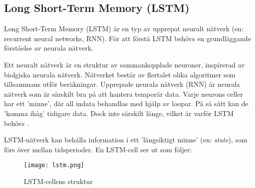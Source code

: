 \documentclass[12pt]{article}
\begin{document}
\subsection{Long Short-Term Memory (LSTM)}
Long Short-Term Memory (LSTM) är en typ av upprepat neuralt nätverk (en: recurrent neural networks, RNN). För att förstå LSTM behövs en grundläggande förståelse av neurala nätverk. \par

Ett neuralt nätverk är en struktur av sammankopplade neuroner, inspirerad av biolgiska neurala nätverk. Nätverket består av flertalet olika algoritmer som tillsammans utför beräkningar. Upprepade neurala nätverk (RNN) är neurala nätverk som är särskilt bra på att hantera temporär data. Varje neurons celler har ett 'minne', där all indata behandlas med hjälp av loopar. På så sätt kan de 'komma ihåg' tidigare data. Dock inte särskilt länge, vilket är varför LSTM behövs \parencite{purkait2019hands}. \par
LSTM-nätverk kan behålla information i ett 'långsiktigt minne' (en: \textit{state}), som förs över mellan tidsperioder. En LSTM-cell ser ut som följer:
\begin{figure}[H]
\caption{LSTM-cellens struktur \parencite[lånad från][]{yuan2019nonlinear}}
\texttt{[image: lstm.png]}
\centering
\end{figure}
\end{document}
